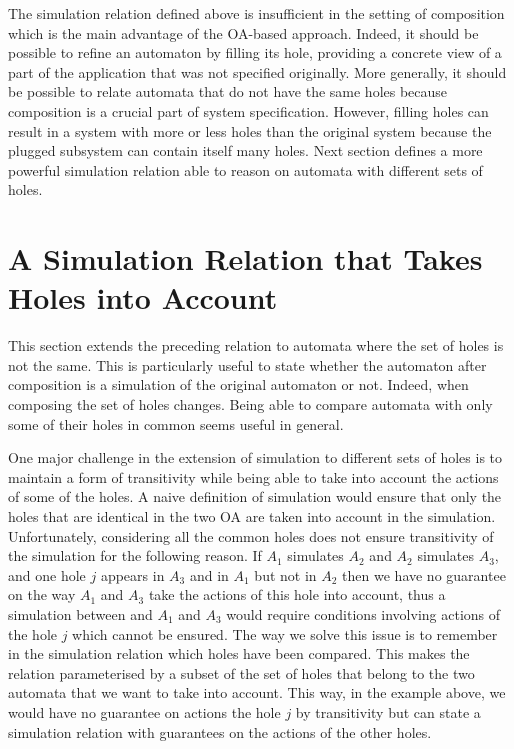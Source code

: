 \documentclass[runningheads]{llncs}
\begin{document}


The simulation relation defined above is insufficient in the setting of composition which is the main advantage of the OA-based approach. Indeed, it should be possible to refine an automaton by filling its hole, providing a concrete view of a part of the application that was not specified originally. 
More generally, it should be possible to relate automata that do not have the same holes because composition is a crucial part of system specification.
However, filling holes can result in a system with more or less holes than the original system because the plugged subsystem can contain itself many holes.
Next section  defines  a more powerful simulation relation able to reason on automata with different sets of holes.








\section{A Simulation Relation that Takes Holes into Account}\label{sec:holes}

This section  extends the preceding relation to automata where the set of holes is not the same. 
This is particularly useful  to state whether the automaton after composition is a simulation of the original automaton or not.
Indeed, when composing the set of  holes changes.
Being able to compare automata with only some of their holes in common seems useful in general.

\medskip
One major challenge in the extension of simulation to different sets of holes is to maintain a form of transitivity while being able to take into account the actions of some of the holes. A naive definition of simulation would ensure that only the holes that are identical in the two OA are taken into account in the simulation. Unfortunately, considering all the common holes does not ensure transitivity of the simulation for the following reason. If $A_1$ simulates $A_2$ and $A_2$ simulates $A_3$, and one hole $j$ appears in $A_3$ and in $A_1$ but not in $A_2$ then we have no guarantee on the way $A_1$ and $A_3$ take the actions of this  hole into account, thus  a simulation between and $A_1$ and $A_3$ would require conditions involving actions of the hole $j$ which cannot be ensured. The way we solve this issue is to remember in the simulation relation which holes have been compared. This makes the relation parameterised by a subset of the set of holes that belong to the two automata that we want to take into account.
This way, in the example above, we would have no guarantee on actions the hole $j$ by transitivity but can state a simulation relation with guarantees on the actions of the other holes.
\end{document}
